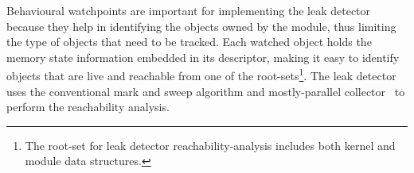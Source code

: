\documentclass[letterpaper,twocolumn,10pt]{article}
\begin{document}

Behavioural watchpoints are important for implementing the leak detector because they help in identifying the objects owned by the module, thus limiting the type of objects that need to be tracked. Each watched object holds the memory state information embedded in its descriptor, making it easy to identify objects that are live and reachable from one of the root-sets\footnote{The root-set for leak detector reachability-analysis includes both kernel and module data structures.}. The leak detector uses the conventional mark and sweep algorithm and mostly-parallel collector~\cite{Boehm:1991:MPG:113445.113459} to perform the reachability analysis.











\end{document}
